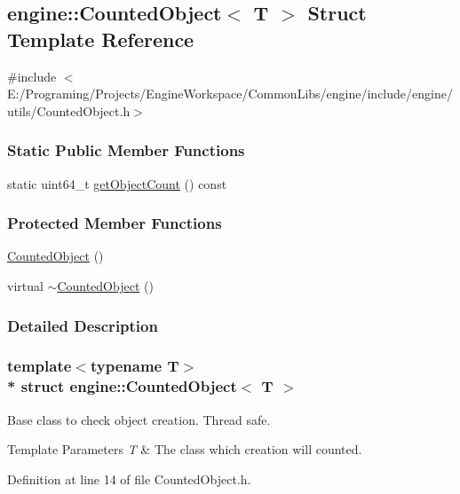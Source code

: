 \hypertarget{a00021}{}\subsection{engine\+:\+:Counted\+Object$<$ T $>$ Struct Template Reference}
\label{a00021}


{\ttfamily \#include $<$E\+:/\+Programing/\+Projects/\+Engine\+Workspace/\+Common\+Libs/engine/include/engine/utils/\+Counted\+Object.\+h$>$}

\subsubsection*{Static Public Member Functions}
\begin{DoxyCompactItemize}
\item 
static uint64\+\_\+t \hyperlink{a00021_a693c549c84cd89d45e46018f9d2f1420}{get\+Object\+Count} () const 
\end{DoxyCompactItemize}
\subsubsection*{Protected Member Functions}
\begin{DoxyCompactItemize}
\item 
\hyperlink{a00021_a9f4f5b1610e616b8c7ffa347c99729e3}{Counted\+Object} ()
\item 
virtual \hyperlink{a00021_a8858bb0d52059b19ffa684c7dc716fe3}{$\sim$\+Counted\+Object} ()
\end{DoxyCompactItemize}


\subsubsection{Detailed Description}
\subsubsection*{template$<$typename T$>$\\*
struct engine\+::\+Counted\+Object$<$ T $>$}

Base class to check object creation. Thread safe. 
\begin{DoxyTemplParams}{Template Parameters}
{\em T} & The class which creation will counted. \\
\hline
\end{DoxyTemplParams}


Definition at line 14 of file Counted\+Object.\+h.



